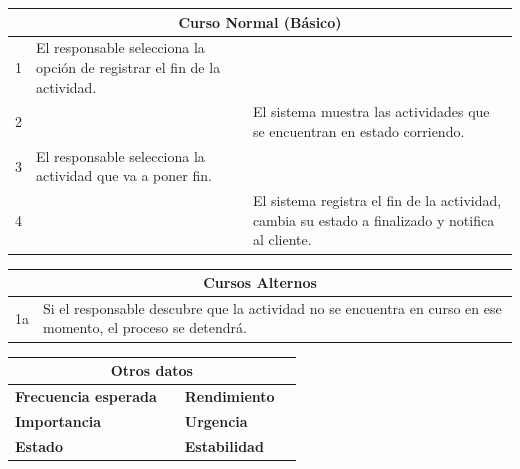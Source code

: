\vspace{0.2cm}

\begin{table}[h!]
\centering
\begin{tabularx}{\textwidth}{|c|X|X|}
\hline
\multicolumn{3}{|c|}{\cellcolor[HTML]{F2F2F2}\textbf{Curso Normal (Básico)}} \\ \hline
1 & El responsable selecciona la opción de registrar el fin de la actividad. & \\ \hline
2 & & El sistema muestra las actividades que se encuentran en estado corriendo. \\ \hline
3 & El responsable selecciona la actividad que va a poner fin. & \\ \hline
4 & & El sistema registra el fin de la actividad, cambia su estado a finalizado y notifica al cliente. \\ \hline
\end{tabularx}
\end{table}

\vspace{0.2cm}

\begin{table}[h!]
\centering
\begin{tabularx}{\textwidth}{|c|X|}
\hline
\multicolumn{2}{|c|}{\cellcolor[HTML]{F2F2F2}\textbf{Cursos Alternos}} \\ \hline
1a & Si el responsable descubre que la actividad no se encuentra en curso en ese momento, el proceso se detendrá. \\ \hline
\end{tabularx}
\end{table}

\vspace{0.2cm}

\begin{table}[h!]
\centering
\begin{tabularx}{\textwidth}{|X|X|X|X|}
\hline
\multicolumn{4}{|c|}{\cellcolor[HTML]{F2F2F2}\textbf{Otros datos}} \\ \hline
\textbf{Frecuencia esperada} &  & \textbf{Rendimiento} &  \\ \hline
\textbf{Importancia} &  & \textbf{Urgencia} &  \\ \hline
\textbf{Estado} & & \textbf{Estabilidad} &  \\ \hline
\end{tabularx}
\end{table}

\vspace{0.2cm}

